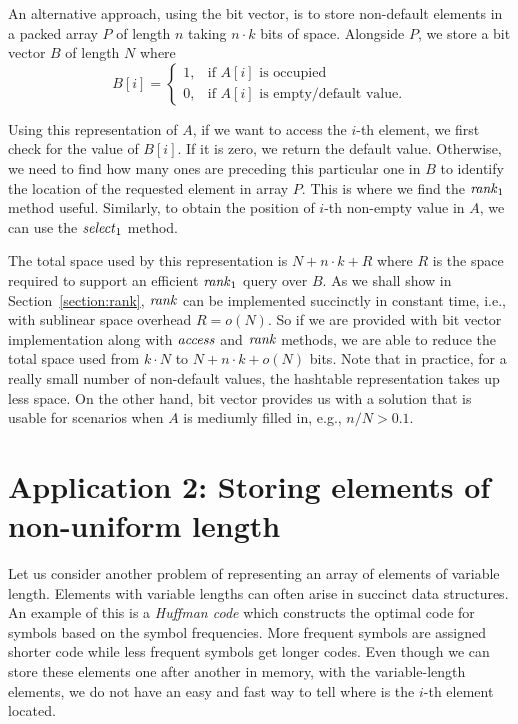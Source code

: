 An alternative approach, using the bit vector, is to store non-default elements in
a packed array $P$ of length $n$ taking $n\cdot k$ bits of space. Alongside $P$, we
store a bit vector $B$ of length $N$ where
\[
   B[i]=
\begin{cases}
   1,& \text{if $A[i]$ is occupied} \\
   0,& \text{if $A[i]$ is empty/default value.}
\end{cases}
\]

Using this representation of $A$, if we want to access the $i$-th element, we first check for
the value of $B[i]$. If it is zero, we return the default value. Otherwise, we need to find
how many ones are preceding this particular one in $B$ to identify the location of the requested
element in array $P$. This is where we find the $\mathit{rank}_1$ method useful. Similarly, to obtain
the position of $i$-th non-empty value in $A$, we can use the $\mathit{select}_1$ method.

The total space used by this representation is $N+n\cdot k+R$ where $R$ is the space required
to support an efficient $\mathit{rank}_1$ query over $B$. As we shall show in Section~\ref{section:rank},
$\mathit{rank}$ can be implemented succinctly in constant time, i.e., with sublinear space overhead
$R = o(N)$. So if we are provided with bit vector implementation along with $\mathit{access}$ and $\mathit{rank}$
methods, we are able to reduce the total space used from $k\cdot N$ to $N+n\cdot k+o(N)$ bits.
Note that in practice, for a really small number of non-default values, the hashtable representation
takes up less space. On the other hand, bit vector provides us with a solution that is usable for
scenarios when $A$ is mediumly filled in, e.g., $n/N>0.1$.

\section{Application 2: Storing elements of non-uniform length}

Let us consider another problem of representing an array of elements of variable length.
Elements with variable lengths can often arise in succinct data structures. An example of
this is a \textit{Huffman code} \citep{huffman1952method} which constructs the optimal
code for symbols based on the symbol frequencies. More frequent symbols are assigned
shorter code while less frequent symbols get longer codes. Even though we can store these
elements one after another in memory, with the variable-length elements, we do not have
an easy and fast way to tell where is the $i$-th element located.

